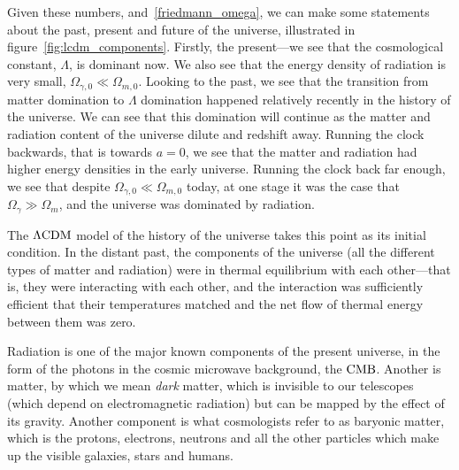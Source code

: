     Given these numbers, and~\eqref{friedmann_omega}, we can make some statements
    about the past, present and future of the universe, illustrated in figure~\ref{fig:lcdm_components}.
    Firstly, the present---we see that the cosmological constant,
    $\Lambda$, is dominant now. We also see that the energy density of radiation
    is very small, $\Omega_{\gamma,0}\ll\Omega_{m,0}$.
    Looking to the past, we see that the transition from matter domination
    to $\Lambda$ domination happened relatively recently in the history of the universe.
    We can see that this domination will continue as the matter and radiation content of the
    universe dilute and redshift away.
    Running the clock backwards, that is towards $a=0$, we see that the matter and radiation had
    higher energy densities in the early universe. Running the clock back far enough, we see
    that despite $\Omega_{\gamma,0}\ll\Omega_{m,0}$ today, at one stage it was the
    case that $\Omega_{\gamma}\gg\Omega_{m}$, and the universe was dominated by radiation.


    The $\Lambda\text{CDM}$ model of the history of the universe takes this point as its initial condition.
    In the distant past, the components of the universe (all the different types of matter and radiation)
    were in thermal equilibrium with each other---that is, they were interacting with each other,
    and the interaction was sufficiently efficient that their temperatures matched
    and the net flow of thermal energy between them was zero.


    Radiation is one of the major known components of the present universe, in the form of the
    photons in the cosmic microwave background, the $\text{CMB}$. Another is matter,
    by which we mean \textit{dark} matter,
    which is invisible to our telescopes (which depend on electromagnetic radiation) but can be mapped by the
    effect of its gravity.
    Another component is what cosmologists refer to as baryonic matter, which is
    the protons, electrons, neutrons and all the other particles which make up the visible galaxies, stars
    and humans.


